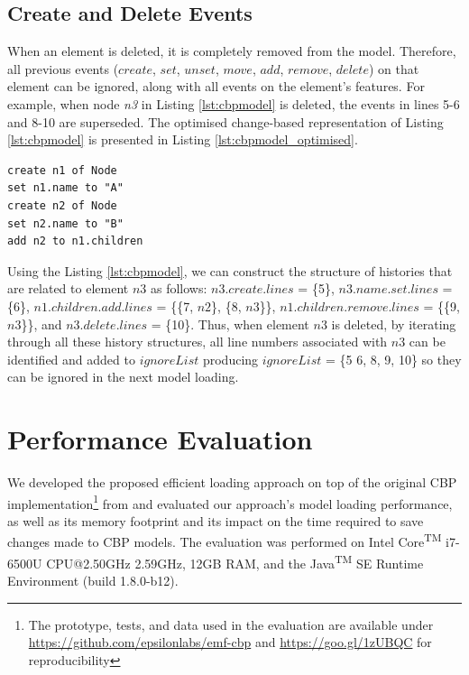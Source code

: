 \documentclass{llncs}
\begin{document}
{    \subsection{Create and Delete Events}
    \label{subsec:create_and_delete_operations}
    
    When an element is deleted, it is completely removed from the model. Therefore, all previous events ($create$, $set$, $unset$, $move$, $add$, $remove$, $delete$) on that element can be ignored, along with all events on the element's features. For example, when node \emph{n3} in Listing \ref{lst:cbpmodel} is deleted, the events in lines 5-6 and 8-10 are superseded. The optimised change-based representation of Listing \ref{lst:cbpmodel} is presented in Listing \ref{lst:cbpmodel_optimised}.
    
    \begin{lstlisting}[style=eol,caption={Change-based representation of the model in Figure \ref{fig:initial_model} after removal of node \emph{n3}.},label=lst:cbpmodel_optimised]
create n1 of Node
set n1.name to "A"
create n2 of Node
set n2.name to "B"
add n2 to n1.children
    \end{lstlisting}
    
    Using the Listing \ref{lst:cbpmodel}, we can construct the structure of histories that are related to element $n3$ as follows: $n3$.$create$.$lines$ = \{5\}, $n3$.$name$.$set$.$lines$ = \{6\}, $n1$.$children$.$add$.$lines$ = \{\{7, $n2$\}, \{8, $n3$\}\}, $n1$.$children$.$remove$.$lines$ = \{\{9, $n3$\}\}, and $n3$.$delete$.$lines$ = \{10\}. Thus, when element $n3$ is deleted, by iterating through all these history structures, all line numbers associated with $n3$ can be identified and added to $ignoreList$ producing $ignoreList$ = \{5 6, 8, 9, 10\} so they can be ignored in the next model loading.
    
    \section{Performance Evaluation}
    \label{sec:performance_evaluation}
    
    We developed the proposed efficient loading approach on top of the original CBP implementation\footnote{The prototype, tests, and data used in the evaluation are available under \url{https://github.com/epsilonlabs/emf-cbp} and \url{https://goo.gl/1zUBQC} for reproducibility} from \cite{yohannis2017turning} and evaluated our approach's model loading performance, as well as its memory footprint and its impact on the time required to save changes made to CBP models. The evaluation was performed on Intel\textsuperscript{\textregistered} Core\textsuperscript{TM} i7-6500U CPU@2.50GHz 2.59GHz, 12GB RAM, and the Java\textsuperscript{TM} SE Runtime Environment (build 1.8.0-b12).
    
}
\end{document}
